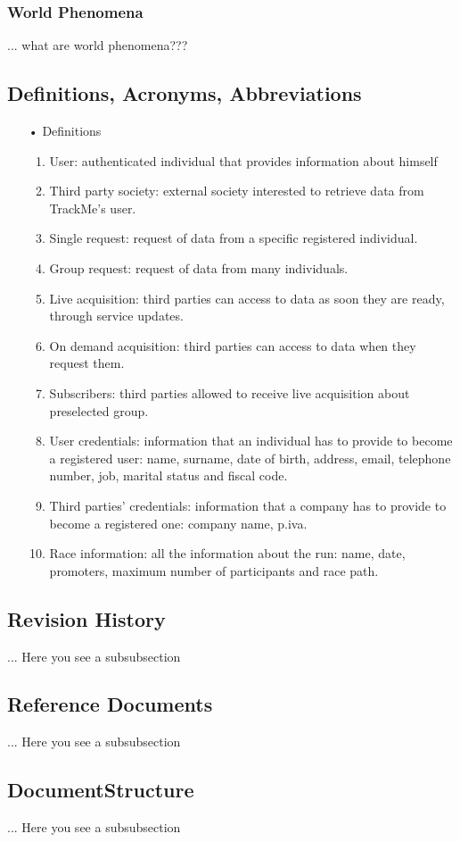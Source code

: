 \subsubsection{World Phenomena}
... what are world phenomena???

\subsection{Definitions, Acronyms, Abbreviations}

\begin{enumerate}
\item[•] {\Large Definitions}
	\begin{enumerate}
		\item User: authenticated individual that provides information about himself
		\item Third party society: external society interested to retrieve data from 					TrackMe's user.
		\item Single request: request of data from a specific registered individual.
		\item Group request: request of data from many individuals. 
		\item Live acquisition: third parties can access to data as soon they are ready, 				through service updates.
		\item On demand acquisition: third parties can access to data when they request 				them.
		\item Subscribers: third parties allowed to receive live acquisition about 						preselected	group.
		\item User credentials: information that an individual has to provide to become a 				registered user: name, surname, date of birth, address, email, telephone
			number, job, marital status and fiscal code. 
		\item Third parties' credentials: information that a company has to provide to 					become a registered one: company name, p.iva.
		\item Race information: all the information about the run: name, date, promoters, 				maximum number of participants and race path.
	\end{enumerate}
\end{enumerate}
	
\subsection{Revision History}
... Here you see a subsubsection
\subsection{Reference Documents}
... Here you see a subsubsection
\subsection{DocumentStructure}
... Here you see a subsubsection

